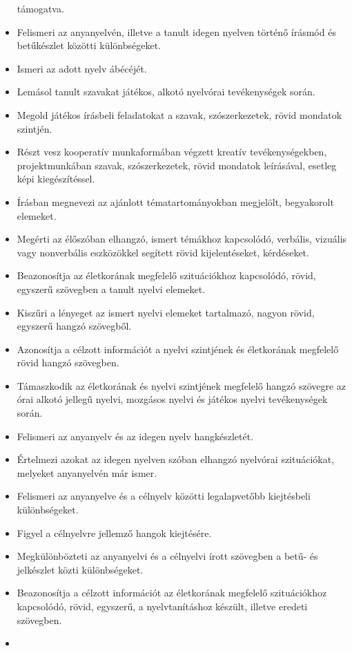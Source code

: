 \begin{itemize}
  támogatva.
\item
  Felismeri az anyanyelvén, illetve a tanult idegen nyelven történő
  írásmód és betűkészlet közötti különbségeket.
\item
  Ismeri az adott nyelv ábécéjét.
\item
  Lemásol tanult szavakat játékos, alkotó nyelvórai tevékenységek során.
\item
  Megold játékos írásbeli feladatokat a szavak, szószerkezetek, rövid
  mondatok szintjén.
\item
  Részt vesz kooperatív munkaformában végzett kreatív tevékenységekben,
  projektmunkában szavak, szószerkezetek, rövid mondatok leírásával,
  esetleg képi kiegészítéssel.
\item
  Írásban megnevezi az ajánlott tématartományokban megjelölt,
  begyakorolt elemeket.
\item
  Megérti az élőszóban elhangzó, ismert témákhoz kapcsolódó, verbális,
  vizuális vagy nonverbális eszközökkel segített rövid kijelentéseket,
  kérdéseket.
\item
  Beazonosítja az életkorának megfelelő szituációkhoz kapcsolódó, rövid,
  egyszerű szövegben a tanult nyelvi elemeket.
\item
  Kiszűri a lényeget az ismert nyelvi elemeket tartalmazó, nagyon rövid,
  egyszerű hangzó szövegből.
\item
  Azonosítja a célzott információt a nyelvi szintjének és életkorának
  megfelelő rövid hangzó szövegben.
\item
  Támaszkodik az életkorának és nyelvi szintjének megfelelő hangzó
  szövegre az órai alkotó jellegű nyelvi, mozgásos nyelvi és játékos
  nyelvi tevékenységek során.
\item
  Felismeri az anyanyelv és az idegen nyelv hangkészletét.
\item
  Értelmezi azokat az idegen nyelven szóban elhangzó nyelvórai
  szituációkat, melyeket anyanyelvén már ismer.
\item
  Felismeri az anyanyelve és a célnyelv közötti legalapvetőbb
  kiejtésbeli különbségeket.
\item
  Figyel a célnyelvre jellemző hangok kiejtésére.
\item
  Megkülönbözteti az anyanyelvi és a célnyelvi írott szövegben a betű-
  és jelkészlet közti különbségeket.
\item
  Beazonosítja a célzott információt az életkorának megfelelő
  szituációkhoz kapcsolódó, rövid, egyszerű, a nyelvtanításhoz készült,
  illetve eredeti szövegben.
\item

\end{itemize}

